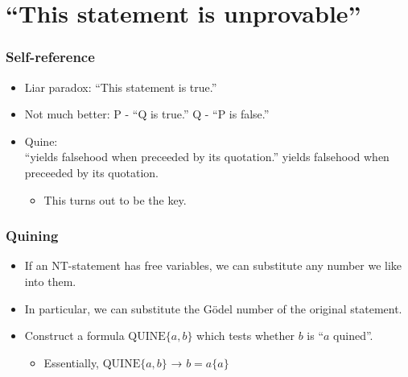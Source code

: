 \documentclass[mathserif]{beamer}
\begin{document}
\section{``This statement is unprovable''}
\label{sec-5}
\begin{frame}
\frametitle{Self-reference}
\label{sec-5-1}

\pause
\begin{itemize}

\item Liar paradox: ``This statement is true.''\pause\\
\label{sec-5-1-1}%
\item Not much better: P - ``Q is true.'' Q - ``P is false.''\pause\\
\label{sec-5-1-2}%
\item Quine:\\
\label{sec-5-1-3}%
``yields falsehood when preceeded by its quotation.'' yields falsehood when preceeded by its quotation.\pause
\begin{itemize}

\item This turns out to be the key.\\
\label{sec-5-1-3-1}%
\end{itemize} %
\end{itemize} %
\end{frame}
\begin{frame}
\frametitle{Quining}
\label{sec-5-2}

\pause
\begin{itemize}

\item If an NT-statement has free variables, we can substitute any number we like into them.\pause\\
\label{sec-5-2-1}%
\item In particular, we can substitute the Gödel number of the original statement.\pause\\
\label{sec-5-2-2}%
\item Construct a formula $\text{QUINE}\{a,b\}$ which tests whether $b$ is ``$a$ quined''.\pause
\label{sec-5-2-3}%
\begin{itemize}

\item Essentially, $\text{QUINE}\{a,b\}$ → $b = a\{a\}$\\
\label{sec-5-2-3-1}%
\end{itemize} %
\end{itemize} %
\end{frame}
\end{document}
